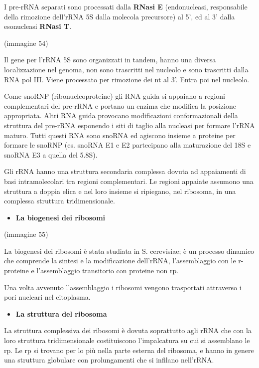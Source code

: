 \documentclass[]{article}
\begin{document}
I pre-rRNA separati sono processati dalla \textbf{RNasi E}
(endonucleasi, responsabile della rimozione dell'rRNA 5S dalla molecola
precursore) al 5', ed al 3' dalla esonucleasi \textbf{RNasi T}.

(immagine 54)

Il gene per l'rRNA 5S sono organizzati in tandem, hanno una diversa
localizzazione nel genoma, non sono trascritti nel nucleolo e sono
trascritti dalla RNA pol III. Viene processato per rimozione dei nt al
3'. Entra poi nel nucleolo.

Come snoRNP (ribonucleoproteine) gli RNA guida si appaiano a regioni
complementari del pre-rRNA e portano un enzima che modifica la posizione
appropriata. Altri RNA guida provocano modificazioni conformazionali
della struttura del pre-rRNA esponendo i siti di taglio alla nucleasi
per formare l'rRNA maturo. Tutti questi RNA sono snoRNA ed agiscono
insieme a proteine per formare le snoRNP (es. snoRNA E1 e E2 partecipano
alla maturazione del 18S e snoRNA E3 a quella del 5.8S).

Gli rRNA hanno una struttura secondaria complessa dovuta ad appaiamenti
di basi intramolecolari tra regioni complementari. Le regioni appaiate
assumono una struttura a doppia elica e nel loro insieme si ripiegano,
nel ribosoma, in una complessa struttura tridimensionale.

\begin{itemize}
\itemsep1pt\parskip0pt
\item
  \textbf{La biogenesi dei ribosomi}
\end{itemize}

(immagine 55)

La biogenesi dei ribosomi è stata studiata in S. cerevisiae; è un
processo dinamico che comprende la sintesi e la modificazione dell'rRNA,
l'assemblaggio con le r-proteine e l'assemblaggio transitorio con
proteine non rp.

Una volta avvenuto l'assemblaggio i ribosomi vengono trasportati
attraverso i pori nucleari nel citoplasma.

\begin{itemize}
\itemsep1pt\parskip0pt
\item
  \textbf{La struttura del ribosoma}
\end{itemize}

La struttura complessiva dei ribosomi è dovuta soprattutto agli rRNA che
con la loro struttura tridimensionale costituiscono l'impalcatura su cui
si assemblano le rp. Le rp si trovano per lo più nella parte esterna del
ribosoma, e hanno in genere una struttura globulare con prolungamenti
che si infilano nell'rRNA.
\end{document}
